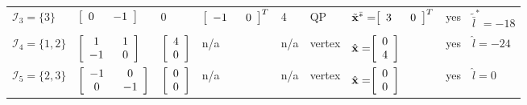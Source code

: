 \documentclass[9pt,twocolumn,twoside,lineno]{pnas-new-1}
\newcommand{\bfx}{{\bf x}}
\newcommand{\calI}{{\mathcal I}}
\theoremstyle{remark}
\begin{document}
\begin{landscape}
\begin{table}[htbp]
\begin{threeparttable}[tbhp]
\begin{tabular}{l l l l l l l l l}
$\calI_3=\{3\}$ & \hspace{-0.07cm}$\left[ \renewcommand{\arraystretch}{1} \begin{array}{cc} 0~~ & -1 \end{array}\right]$ & 0 & \hspace{-0.1cm}$\left[ \renewcommand{\arraystretch}{1} \begin{array}{cc} -1~~ & 0 \end{array}\right]^T$ & 4 & QP & $\tilde\bfx^{\bar *}=\hspace{-0.1cm}\left[ \renewcommand{\arraystretch}{1} \begin{array}{cc} 3~~ & 0 \end{array}\right]^T$ & yes & $\tilde{\bar l}^*=-18$ \vspace{0.1cm} \\
$\calI_4=\{1,2\}$ & \hspace{-0.1cm}$\left[ \renewcommand{\arraystretch}{1} \begin{array}{cc} 1 & ~~1 \\ -1 & ~~0 \end{array}\right]$ & \hspace{-0.1cm}$\left[ \renewcommand{\arraystretch}{1} \begin{array}{c} 4 \\ 0 \end{array}\right]$ & \hspace{-0.05cm}n/a & n/a & vertex & $\hat\bfx=\hspace{-0.1cm}\left[ \renewcommand{\arraystretch}{1} \begin{array}{c} 0 \\ 4 \end{array}\right]$ & yes & $\hat l=-24$ \vspace{0.1cm} \vspace{0.1cm} \\
$\calI_5=\{2,3\}$ & \hspace{-0.1cm}$\left[ \renewcommand{\arraystretch}{1} \begin{array}{cc} -1 & ~~0 \\ 0 & ~~{-1} \end{array}\right]$ & \hspace{-0.1cm}$\left[ \renewcommand{\arraystretch}{1} \begin{array}{c} 0 \\ 0 \end{array}\right]$ & \hspace{-0.05cm}n/a & n/a & vertex & $\hat\bfx=\hspace{-0.1cm}\left[ \renewcommand{\arraystretch}{1} \begin{array}{c} 0 \\ 0 \end{array}\right]$ & yes & $\hat l=0$ \vspace{0.1cm} \vspace{0.1cm} \\

\end{tabular}
\end{threeparttable}
\end{table}
\end{landscape}
\end{document}
